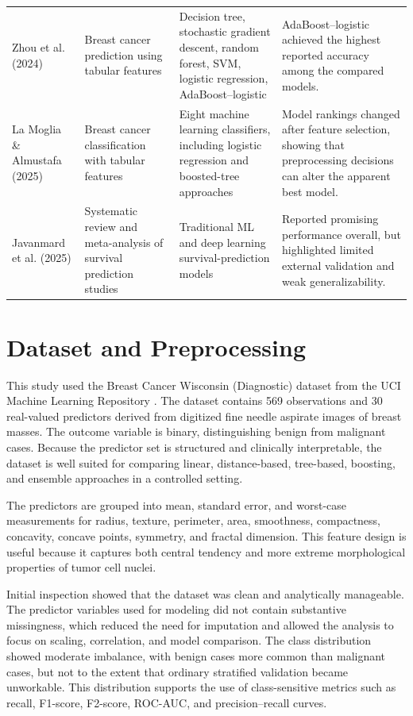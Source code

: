 \documentclass[conference]{IEEEtran}
\begin{document}
\begin{table}[htbp]
\begin{tabularx}{\textwidth}{>{\raggedright\arraybackslash}p{2.7cm} >{\raggedright\arraybackslash}p{2.8cm} >{\raggedright\arraybackslash}X >{\raggedright\arraybackslash}X}
Zhou et al. (2024) \cite{b9} & Breast cancer prediction using tabular features & Decision tree, stochastic gradient descent, random forest, SVM, logistic regression, AdaBoost--logistic & AdaBoost--logistic achieved the highest reported accuracy among the compared models. \\
La Moglia \& Almustafa (2025) \cite{b6} & Breast cancer classification with tabular features & Eight machine learning classifiers, including logistic regression and boosted-tree approaches & Model rankings changed after feature selection, showing that preprocessing decisions can alter the apparent best model. \\
Javanmard et al. (2025) \cite{b19} & Systematic review and meta-analysis of survival prediction studies & Traditional ML and deep learning survival-prediction models & Reported promising performance overall, but highlighted limited external validation and weak generalizability. \\
\bottomrule
\end{tabularx}
\end{table}

\section{Dataset and Preprocessing}
This study used the Breast Cancer Wisconsin (Diagnostic) dataset from the UCI Machine Learning Repository \cite{b8}. The dataset contains 569 observations and 30 real-valued predictors derived from digitized fine needle aspirate images of breast masses. The outcome variable is binary, distinguishing benign from malignant cases. Because the predictor set is structured and clinically interpretable, the dataset is well suited for comparing linear, distance-based, tree-based, boosting, and ensemble approaches in a controlled setting.

The predictors are grouped into mean, standard error, and worst-case measurements for radius, texture, perimeter, area, smoothness, compactness, concavity, concave points, symmetry, and fractal dimension. This feature design is useful because it captures both central tendency and more extreme morphological properties of tumor cell nuclei.

Initial inspection showed that the dataset was clean and analytically manageable. The predictor variables used for modeling did not contain substantive missingness, which reduced the need for imputation and allowed the analysis to focus on scaling, correlation, and model comparison. The class distribution showed moderate imbalance, with benign cases more common than malignant cases, but not to the extent that ordinary stratified validation became unworkable. This distribution supports the use of class-sensitive metrics such as recall, F1-score, F2-score, ROC-AUC, and precision--recall curves.
\end{document}
